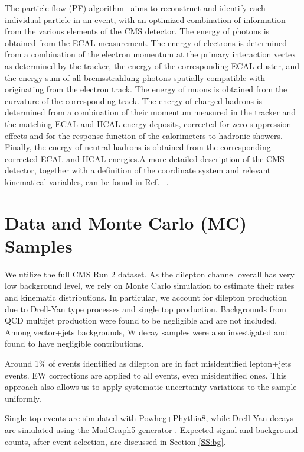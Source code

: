 The particle-flow (PF) algorithm~\cite{CMS-PRF-14-001} aims to reconstruct and identify each individual particle in an event, with an optimized combination of information from the various elements of the CMS detector. The energy of photons is obtained from the ECAL measurement. The energy of electrons is determined from a combination of the electron momentum at the primary interaction vertex as determined by the tracker, the energy of the corresponding ECAL cluster, and the energy sum of all bremsstrahlung photons spatially compatible with originating from the electron track. The energy of muons is obtained from the curvature of the corresponding track. The energy of charged hadrons is determined from a combination of their momentum measured in the tracker and the matching ECAL and HCAL energy deposits, corrected for zero-suppression effects and for the response function of the calorimeters to hadronic showers. Finally, the energy of neutral hadrons is obtained from the corresponding corrected ECAL and HCAL energies.A more detailed description of the CMS detector, together with a definition of the
coordinate system and relevant kinematical variables, can be found in Ref. ~\cite{Chatrchyan:2008zzk}.

\section{Data and Monte Carlo (MC) Samples}



We utilize the full CMS Run 2 dataset. As the \ttbar dilepton channel  overall has very low background level, we rely on Monte Carlo simulation to estimate their rates and kinematic distributions. In particular, we  account for dilepton production due to Drell-Yan type processes and single top production. Backgrounds from QCD multijet production were found to be negligible and are not included. Among vector+jets backgrounds, W decay samples were also investigated and found to have negligible contributions. 

Around 1\% of events identified as \ttbar dilepton are in fact misidentified \ttbar lepton+jets events.  EW corrections are applied to all \ttbar events,  even  misidentified ones. This approach also allows us to apply systematic uncertainty variations to the \ttbar sample uniformly.

Single top events are simulated with Powheg+Phythia8, while Drell-Yan decays are simulated using the MadGraph5 generator \cite{Alwall:2014hca}. Expected signal and background counts, after event selection, are discussed in Section \ref{SS:bg}.

